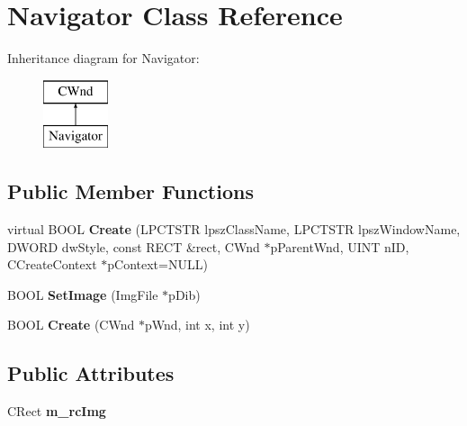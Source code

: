 \hypertarget{class_navigator}{}\section{Navigator Class Reference}
\label{class_navigator}
Inheritance diagram for Navigator\+:\begin{figure}[H]
\begin{center}
\leavevmode
\includegraphics[height=2.000000cm]{class_navigator}
\end{center}
\end{figure}
\subsection*{Public Member Functions}
\begin{DoxyCompactItemize}
\item 
\mbox{\label{class_navigator_a9d42cf2b335c6366f4f70c09a07c31c0}} 
virtual B\+O\+OL {\bfseries Create} (L\+P\+C\+T\+S\+TR lpsz\+Class\+Name, L\+P\+C\+T\+S\+TR lpsz\+Window\+Name, D\+W\+O\+RD dw\+Style, const R\+E\+CT \&rect, C\+Wnd $\ast$p\+Parent\+Wnd, U\+I\+NT n\+ID, C\+Create\+Context $\ast$p\+Context=N\+U\+LL)
\item 
\mbox{\label{class_navigator_aa7ba51bbca8910888f8a72c2c3948955}} 
B\+O\+OL {\bfseries Set\+Image} (Img\+File $\ast$p\+Dib)
\item 
\mbox{\label{class_navigator_a859cb322ac1f07a22ad361098bfacc1c}} 
B\+O\+OL {\bfseries Create} (C\+Wnd $\ast$p\+Wnd, int x, int y)
\end{DoxyCompactItemize}
\subsection*{Public Attributes}
\begin{DoxyCompactItemize}
\item 
\mbox{\label{class_navigator_a242d4351f7c96e1269e172086fb44e01}} 
C\+Rect {\bfseries m\+\_\+rc\+Img}
\end{DoxyCompactItemize}
